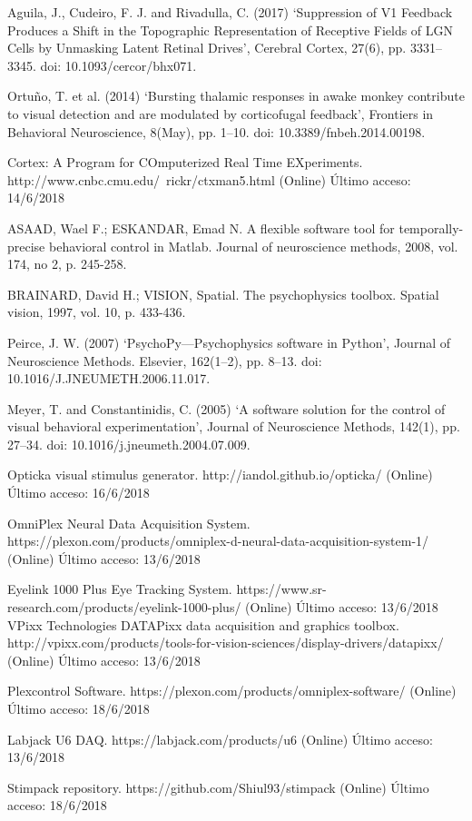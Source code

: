 \documentclass[conference]{IEEEtran}
\begin{document}
\begin{thebibliography}{00}
 Aguila, J., Cudeiro, F. J. and Rivadulla, C. (2017) ‘Suppression of V1 Feedback Produces a Shift in the Topographic Representation of Receptive Fields of LGN Cells by Unmasking Latent Retinal Drives’, Cerebral Cortex, 27(6), pp. 3331–3345. doi: 10.1093/cercor/bhx071.

 Ortuño, T. et al. (2014) ‘Bursting thalamic responses in awake monkey contribute to visual detection and are modulated by corticofugal feedback’, Frontiers in Behavioral Neuroscience, 8(May), pp. 1–10. doi: 10.3389/fnbeh.2014.00198.

 Cortex: A Program for COmputerized Real Time EXperiments. http://www.cnbc.cmu.edu/~rickr/ctxman5.html (Online) Último acceso: 14/6/2018


ASAAD, Wael F.; ESKANDAR, Emad N. A flexible software tool for temporally-precise behavioral control in Matlab. Journal of neuroscience methods, 2008, vol. 174, no 2, p. 245-258.


 BRAINARD, David H.; VISION, Spatial. The psychophysics toolbox. Spatial vision, 1997, vol. 10, p. 433-436.

 Peirce, J. W. (2007) ‘PsychoPy—Psychophysics software in Python’, Journal of Neuroscience Methods. Elsevier, 162(1–2), pp. 8–13. doi: 10.1016/J.JNEUMETH.2006.11.017.

 Meyer, T. and Constantinidis, C. (2005) ‘A software solution for the control of visual behavioral experimentation’, Journal of Neuroscience Methods, 142(1), pp. 27–34. doi: 10.1016/j.jneumeth.2004.07.009.

 Opticka visual stimulus generator. http://iandol.github.io/opticka/ (Online) Último acceso: 16/6/2018


 OmniPlex Neural Data Acquisition System. https://plexon.com/products/omniplex-d-neural-data-acquisition-system-1/ (Online) Último acceso: 13/6/2018

 Eyelink 1000 Plus Eye Tracking System. https://www.sr-research.com/products/eyelink-1000-plus/ (Online) Último acceso: 13/6/2018
 VPixx Technologies DATAPixx data acquisition and graphics toolbox. http://vpixx.com/products/tools-for-vision-sciences/display-drivers/datapixx/  (Online) Último acceso: 13/6/2018

 Plexcontrol Software. https://plexon.com/products/omniplex-software/ (Online) Último acceso: 18/6/2018

 Labjack U6 DAQ. https://labjack.com/products/u6 (Online) Último acceso: 13/6/2018




 Stimpack repository. https://github.com/Shiul93/stimpack (Online) Último acceso: 18/6/2018

\end{thebibliography}

\vspace{12pt}
\end{document}
